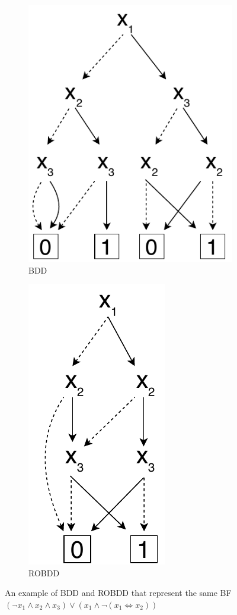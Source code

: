 \documentclass[
  digital, %
  twoside, %
  table,   %
  nolof,     %
  nolot,     %
]{fithesis3}
\theoremstyle{definition}
\theoremstyle{remark}
\newcommand{\lequal}{\Leftrightarrow}
\begin{document}
\begin{figure}[ht]
    \centering
    \begin{subfigure}[b]{.5\linewidth}
        \centering
        \includegraphics{figures/bdd1.pdf}
        \caption{BDD}
        \label{fig:BDD}
    \end{subfigure}%
    \begin{subfigure}[b]{.5\linewidth}
        \centering
        \includegraphics{figures/bdd2.pdf}
        \caption{ROBDD}
        \label{fig:ROBDD}
    \end{subfigure}
    \caption{An example of BDD and ROBDD that represent the same BF $(\neg x_1 \land x_2 \land x_3) \lor (x_1 \land \neg (x_1 \lequal x_2))$}
    \label{fig:BDDandROBDD}
\end{figure}
\end{document}
